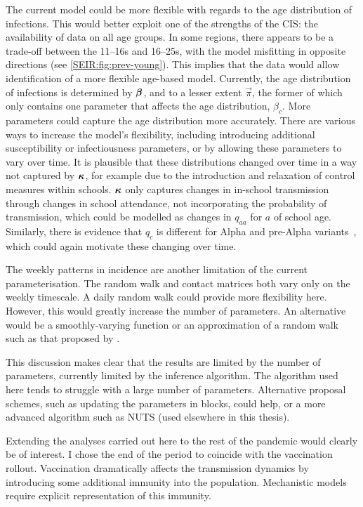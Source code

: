 \documentclass[thesis.tex]{subfiles}
\begin{document}
The current model could be more flexible with regards to the age distribution of infections.
This would better exploit one of the strengths of the CIS: the availability of data  on all age groups.
In some regions, there appears to be a trade-off between the 11--16s and 16--25s, with the model misfitting in opposite directions (see \cref{SEIR:fig:prev-young}).
This implies that the data would allow identification of a more flexible age-based model.
Currently, the age distribution of infections is determined by $\bm{\beta}$, and to a lesser extent $\vec{\pi}$, the former of which only contains one parameter that affects the age distribution, $\beta_c$.
More parameters could capture the age distribution more accurately.
There are various ways to increase the model's flexibility, including introducing additional susceptibility or infectiousness parameters, or by allowing these parameters to vary over time.
It is plausible that these distributions changed over time in a way not captured by $\bm{\kappa}$, for example due to the introduction and relaxation of control measures within schools.
$\bm{\kappa}$ only captures changes in in-school transmission through changes in school attendance, not incorporating the probability of transmission, which could be modelled as changes in $q_{aa}$ for $a$ of school age.
Similarly, there is evidence that $q_c$ is different for Alpha and pre-Alpha variants~\autocite{zhuRole}, which could again motivate these changing over time.

The weekly patterns in incidence are another limitation of the current parameterisation.
The random walk and contact matrices both vary only on the weekly timescale.
A daily random walk could provide more flexibility here.
However, this would greatly increase the number of parameters.
An alternative would be a smoothly-varying function or an approximation of a random walk such as that proposed by \textcite{ghoshApproximate}.

This discussion makes clear that the results are limited by the number of parameters, currently limited by the inference algorithm.
The algorithm used here tends to struggle with a large number of parameters.
Alternative proposal schemes, such as updating the parameters in blocks, could help, or a more advanced algorithm such as NUTS (used elsewhere in this thesis).

Extending the analyses carried out here to the rest of the pandemic would clearly be of interest.
I chose the end of the period to coincide with the vaccination rollout.
Vaccination dramatically affects the transmission dynamics by introducing some additional immunity into the population.
Mechanistic models require explicit representation of this immunity.
\end{document}
